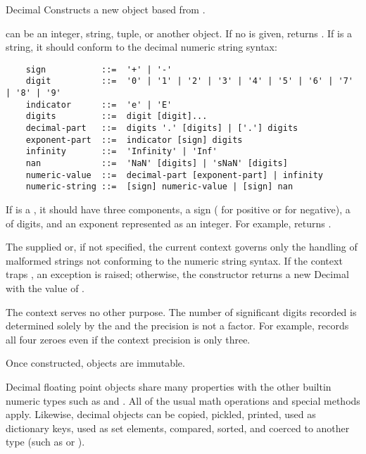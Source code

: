 \begin{classdesc}{Decimal}{}
  Constructs a new  object based from .

   can be an integer, string, tuple, or another 
  object. If no  is given, returns .  If
   is a string, it should conform to the decimal numeric string
  syntax:
    
  \begin{verbatim}
    sign           ::=  '+' | '-'
    digit          ::=  '0' | '1' | '2' | '3' | '4' | '5' | '6' | '7' | '8' | '9'
    indicator      ::=  'e' | 'E'
    digits         ::=  digit [digit]...
    decimal-part   ::=  digits '.' [digits] | ['.'] digits
    exponent-part  ::=  indicator [sign] digits
    infinity       ::=  'Infinity' | 'Inf'
    nan            ::=  'NaN' [digits] | 'sNaN' [digits]
    numeric-value  ::=  decimal-part [exponent-part] | infinity
    numeric-string ::=  [sign] numeric-value | [sign] nan  
  \end{verbatim}

  If  is a , it should have three components,
  a sign ( for positive or  for negative),
  a  of digits, and an exponent represented as an integer.
  For example,  returns
  .

  The supplied  or, if not specified, the current context
  governs only the handling of malformed strings not conforming to the
  numeric string syntax.  If the context traps ,
  an exception is raised; otherwise, the constructor returns a new Decimal
  with the value of .

  The context serves no other purpose.  The number of significant digits
  recorded is determined solely by the  and the 
  precision is not a factor.  For example,  records
  all four zeroes even if the context precision is only three.

  Once constructed,  objects are immutable.
\end{classdesc}

Decimal floating point objects share many properties with the other builtin
numeric types such as  and .  All of the usual
math operations and special methods apply.  Likewise, decimal objects can
be copied, pickled, printed, used as dictionary keys, used as set elements,
compared, sorted, and coerced to another type (such as 
or ).


